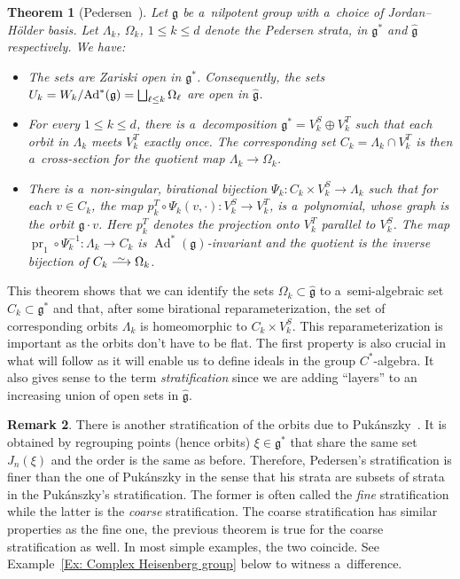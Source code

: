\documentclass[pdftex]{sigma}
\newcommand{\Ad}{\operatorname{Ad}} %
\newcommand{\g}{\mathfrak{g}} %
\newcommand{\pr}{\operatorname{pr}} %
\newcommand\isomto{\stackrel{\sim}{\smash{\longrightarrow}\rule{0pt}{0.4ex}}}
\numberwithin{equation}{section}
\newtheorem{thm}{Theorem}[section]
\theoremstyle{definition}
\newtheorem{rem}[thm]{Remark}
\begin{document}
\begin{thm}[Pedersen~\cite{PedersenStratification}]\label{Theorem:ClassicPedersecStrat}
 Let $\g$ be a~nilpotent group with a~choice of Jordan--H\"older basis. Let $\Lambda_k$, $\Omega_k$, $1\leq k \leq d$ denote the Pedersen strata, in $\g^*$ and $\widehat{\g}$ respectively. We have:
 \begin{itemize}
\itemsep=0pt
 \item The sets  are Zariski open in $\g^*$. Consequently, the sets $U_k = \smash{{W_k}/{\Ad^*(\g)}} = \smash{ \bigsqcup_{\ell\leq k}\Omega_{\ell}}$ are open in $\widehat{\g}$.
 \item For every $1\leq k \leq d$, there is a~decomposition $\g^* = V_k^S\oplus V_k^T$ such that each orbit in $\Lambda_k$ meets $V_k^T$ exactly once. The corresponding set $C_k = \Lambda_k \cap V_k^T$ is then a~cross-section for the quotient map $\Lambda_k \to \Omega_k$.
 \item There is a~non-singular, birational bijection $\Psi_k \colon C_k \times V_k^S \to \Lambda_k$ such that for each $v\in C_k$, the map $p_k^T \circ \Psi_k(v,\cdot) \colon V_k^S \to V_k^T$,
 is a~polynomial, whose graph is the orbit $\g \cdot v$. Here $p_k^T$ denotes the projection onto $V_k^T$ parallel to $V_k^S$. The map $\pr_1\circ \Psi_k^{-1} \colon \Lambda_k \to C_k$
 is $\Ad^*(\g)$-invariant and the quotient is the inverse bijection of $C_k \isomto \Omega_k$.
 \end{itemize}
\end{thm}

This theorem shows that we can identify the sets $\Omega_k\subset \widehat{\g}$ to a~semi-algebraic set ${C_k \subset \g^*}$ and that, after some birational reparameterization, the set of corresponding orbits $\Lambda_k$ is homeo\-morphic to $C_k \times V_k^S$. This reparameterization is important as the orbits don't have to be flat. The first property is also crucial in what will follow as it will enable us to define ideals in the group $C^*$-algebra. It also gives sense to the term \emph{stratification} since we are adding ``layers'' to an increasing union of open sets in $\widehat{\g}$.

\begin{rem}
 There is another stratification of the orbits due to Puk\'anszky~\cite{Pukanszky}. It is obtained by regrouping points (hence orbits) $\xi \in\g^*$ that share the same set $J_n(\xi)$ and the order is the same as before. Therefore, Pedersen's stratification is finer than the one of Puk\'anszky in the sense that his strata are subsets of strata in the Puk\'anszky's stratification. The former is often called the \emph{fine} stratification while the latter is the \emph{coarse} stratification. The coarse stratification has similar properties as the fine one, the previous theorem is true for the coarse stratification as well. In most simple examples, the two coincide. See Example~\ref{Ex: Complex Heisenberg group} below to witness a~difference.
\end{rem}
\end{document}
